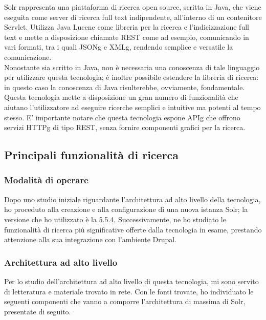 		\gls{Solr} rappresenta una piattaforma di ricerca \gls{open source}, scritta in \gls{Java}, che viene eseguita come server di ricerca full text indipendente, all'interno di un contenitore \gls{Servlet}. Utilizza \gls{Java Lucene} come libreria per la ricerca e l'indicizzazione full text e mette a disposizione chiamate \gls{REST} come ad esempio, comunicando in vari formati, tra i quali \gls{JSONg} e \gls{XMLg}, rendendo semplice e versatile la comunicazione. \\ Nonostante sia scritto in \gls{Java}, non è necessaria una conoscenza di tale linguaggio per utilizzare questa tecnologia; è inoltre possibile estendere la libreria di ricerca: in questo caso la conoscenza di \gls{Java} risulterebbe, ovviamente, fondamentale. \\
		Questa tecnologia mette a disposizione un gran numero di funzionalità che aiutano l'utilizzatore ad eseguire ricerche semplici e intuitive ma potenti al tempo stesso. E' importante notare che questa tecnologia espone \gls{APIg} che offrono servizi \gls{HTTPg} di tipo \gls{REST}, senza fornire componenti grafici per la ricerca.
		
		\subsection{Principali funzionalità di ricerca}
		
			\subsubsection{Modalità di operare}
			Dopo uno studio iniziale riguardante l'architettura ad alto livello della tecnologia, ho proceduto alla creazione e alla configurazione di una nuova istanza \gls{Solr}; la versione che ho utilizzato è la 5.5.4. Successivamente, ne ho studiato le funzionalità di ricerca più significative offerte dalla tecnologia in esame, prestando attenzione alla sua integrazione con l'ambiente \gls{Drupal}.
			
			\subsubsection{Architettura ad alto livello}
			Per lo studio dell'architettura ad alto livello di questa tecnologia, mi sono servito di letteratura e materiale trovato in rete. Con le fonti trovate, ho individuato le seguenti componenti che vanno a comporre l'architettura di massima di \gls{Solr}, presentate di seguito.
			

